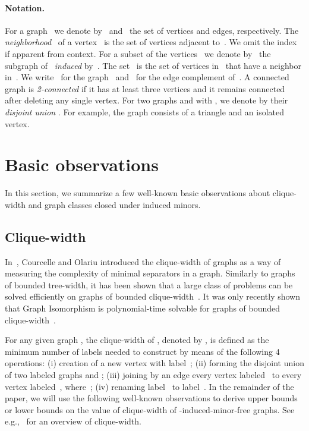 \documentclass[envcountsame,envcountsect,11pt,a4paper]{llncs}
\begin{document}
\paragraph{Notation.}
For a graph~ we denote by~ and~ the set of vertices and edges, respectively.
The \emph{neighborhood}~ of a vertex~ is the set of vertices adjacent to~.
We omit the index~ if apparent from context.
For a subset of the vertices~ we denote by~ the subgraph of~ \emph{induced} by~.
The set~ is the set of vertices in~ that have a neighbor in~.
We write~ for the graph~ and~ for the edge complement of~.
A connected graph is \emph{2-connected} if it has at least three vertices and
it remains connected after deleting any single vertex.
For two graphs  and  with ,
we denote by  their \emph{disjoint union} .
For example, the graph  consists of a triangle and an isolated vertex.




\section{Basic observations}\label{sec:basic:obs}

In this section, we summarize a few well-known basic observations about clique-width and graph classes closed under induced minors.

\subsection{Clique-width}

In~\cite{CourcelleOlariu2000}, Courcelle and Olariu introduced the clique-width of graphs as a way of measuring the complexity of minimal
separators in a graph. Similarly to graphs of bounded tree-width, it has been shown that a large class of problems can be solved efficiently
on graphs of bounded clique-width~\cite{CMR00}.
It was only recently shown that {\sc Graph Isomorphism} is polynomial-time solvable for graphs of bounded clique-width~\cite{rankwidth}.

For any given graph , the clique-width of , denoted by , is defined as the minimum number of labels needed to construct  by
means of the following 4 operations: (i) creation of a new vertex  with label~; (ii) forming the disjoint union of two labeled graphs
 and ; (iii) joining by an edge every vertex labeled~ to every vertex labeled~, where~; (iv) renaming label~ to
label~. In the remainder of the paper, we will use the following well-known observations to derive upper bounds or lower bounds on
the value of clique-width of -induced-minor-free graphs. See e.g.,~\cite{HOSG08} for an overview of clique-width.
\end{document}

